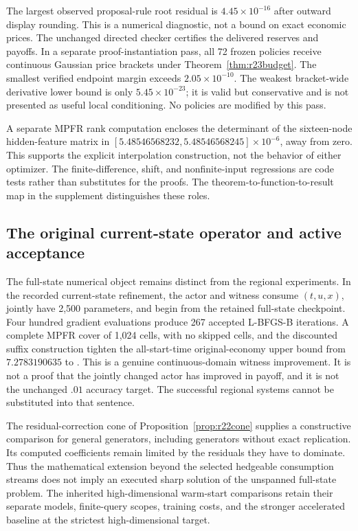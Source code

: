 The largest observed proposal-rule root residual is $4.45\times10^{-16}$ after outward display rounding. This is a numerical diagnostic, not a bound on exact economic prices. The unchanged directed checker certifies the delivered reserves and payoffs. In a separate proof-instantiation pass, all 72 frozen policies receive continuous Gaussian price brackets under Theorem~\ref{thm:r23budget}. The smallest verified endpoint margin exceeds $2.05\times10^{-10}$. The weakest bracket-wide derivative lower bound is only $5.45\times10^{-23}$; it is valid but conservative and is not presented as useful local conditioning. No policies are modified by this pass.

A separate MPFR rank computation encloses the determinant of the sixteen-node hidden-feature matrix in $[5.48546568232,5.48546568245]\times10^{-6}$, away from zero. This supports the explicit interpolation construction, not the behavior of either optimizer. The finite-difference, shift, and nonfinite-input regressions are code tests rather than substitutes for the proofs. The theorem-to-function-to-result map in the supplement distinguishes these roles.

\subsection{The original current-state operator and active acceptance}
The full-state numerical object remains distinct from the regional experiments. In the recorded current-state refinement, the actor and witness consume $(t,u,x)$, jointly have 2,500 parameters, and begin from the retained full-state checkpoint. Four hundred gradient evaluations produce 267 accepted L-BFGS-B iterations. A complete MPFR cover of 1,024 cells, with no skipped cells, and the discounted suffix construction tighten the all-start-time original-economy upper bound from $7.2783190635$ to \RXXIIGlobalBound{}. This is a genuine continuous-domain witness improvement. It is not a proof that the jointly changed actor has improved in payoff, and it is not the unchanged $.01$ accuracy target. The successful regional systems cannot be substituted into that sentence.

The residual-correction cone of Proposition~\ref{prop:r22cone} supplies a constructive comparison for general generators, including generators without exact replication. Its computed coefficients remain limited by the residuals they have to dominate. Thus the mathematical extension beyond the selected hedgeable consumption streams does not imply an executed sharp solution of the unspanned full-state problem. The inherited high-dimensional warm-start comparisons retain their separate models, finite-query scopes, training costs, and the stronger accelerated baseline at the strictest high-dimensional target.

